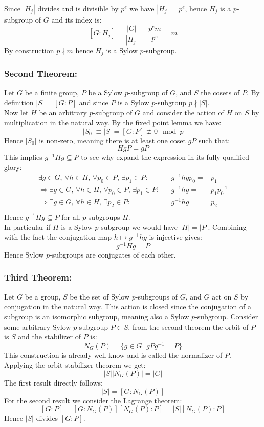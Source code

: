 Since $|H_j|$ divides and is divisible by $p^e$ we have $|H_j|=p^e$,
hence $H_j$ is a $p$-subgroup of $G$ and its index is:
\[[G:H_j] = \frac{|G|}{|H_j|} = \frac{p^em}{p^e} = m\]
By construction $p\nmid m$ hence $H_j$ is a Sylow $p$-subgroup.

\subsubsection{Second Theorem:}
Let $G$ be a finite group, 
$P$ be a Sylow $p$-subgroup of $G$,
and $S$ the cosets of $P$.
By definition $|S| = [G:P]$ and since $P$ is a Sylow $p$-subgroup $p\nmid |S|$.
\\

Now let $H$ be an arbitrary $p$-subgroup of $G$ and consider the action of $H$ on $S$ by multiplication in the natural way.
By the fixed point lemma we have: 
\[|S_0| \equiv |S| = [G:P]\not\equiv 0\mod p\]
Hence $|S_0|$ is non-zero,
meaning there is at least one coset $gP$ such that:
\[HgP = gP\]
This implies $g^{-1}Hg\subseteq P$ to see why expand the expression in its fully qualified glory: 
\[\begin{aligned}
	\exists g\in G,\,\forall h\in H,\,\forall p_0\in P,\, \exists p_1\in P:&& g^{-1}hgp_0=&p_1\\
	\Rightarrow\exists g\in G,\,\forall h\in H,\,\forall p_0\in P,\, \exists p_1\in P:&& g^{-1}hg=&p_1p_0^{-1}\\
	\Rightarrow\exists g\in G,\,\forall h\in H,\, \exists p_2\in P:&& g^{-1}hg=&p_2\\
\end{aligned}\]
Hence $g^{-1}Hg\subseteq P$ for all $p$-subgroups $H$.
\\

In particular if $H$ is a Sylow $p$-subgroup we would have $|H| = |P|$.
Combining with the fact the conjugation map $h\mapsto g^{-1}hg$ is injective gives:
\[g^{-1}Hg=P\]
Hence Sylow $p$-subgroups are conjugates of each other.

\subsubsection{Third Theorem:}
Let $G$ be a group, 
$S$ be the set of Sylow $p$-subgroups of $G$,
and $G$ act on $S$ by conjugation in the natural way.
This action is closed since the conjugation of a subgroup is an isomorphic subgroup,
meaning also a Sylow $p$-subgroup.
Consider some arbitrary Sylow $p$-subgroup $P\in S$,
from the second theorem the orbit of $P$ is $S$ and the stabilizer of $P$ is:
\[N_G(P) = \{g\in G\,|\,gPg^{-1} = P\}\]
This construction is already well know and is called the normalizer of $P$.
Applying the orbit-stabilizer theorem we get:
\[|S||N_G(P)|=|G|\]
The first result directly follows:
\[|S| = [G:N_G(P)]\]
For the second result we consider the Lagrange theorem:
\[[G:P] = [G:N_G(P)][N_G(P):P] = |S|[N_G(P):P]\]
Hence $|S|$ divides $[G:P]$.
\\

